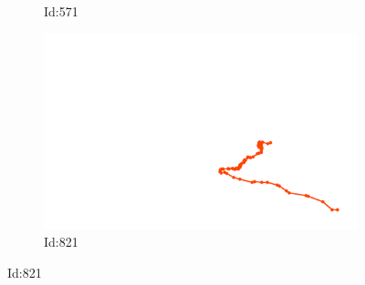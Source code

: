 \documentclass[12pt,twoside]{report}
\begin{document}
\begin{figure}
\begin{subfigure}[b]{0.20\textwidth}
\caption{Id:571}
\end{subfigure}
\begin{subfigure}[b]{0.20\textwidth}
\centering
\includegraphics[width=\textwidth]{../../trajectories/821.png}
\caption{Id:821}
\end{subfigure}
\end{figure}
\end{document}
